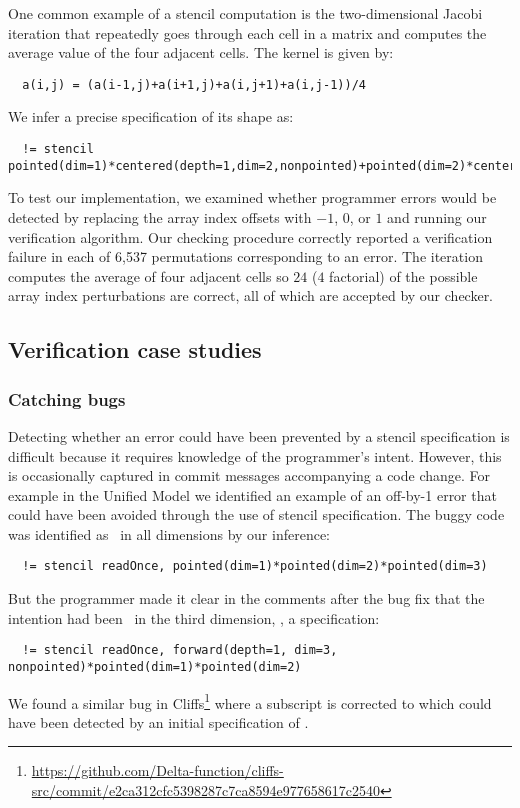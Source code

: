 \noindent
One common example of a stencil computation is the two-dimensional
Jacobi iteration that repeatedly goes through each cell in a matrix
and computes the average value of the four adjacent cells. The kernel
is given by:
\begin{verbatim}
  a(i,j) = (a(i-1,j)+a(i+1,j)+a(i,j+1)+a(i,j-1))/4
\end{verbatim}
We infer a precise specification of its shape as:
\begin{verbatim}
  != stencil pointed(dim=1)*centered(depth=1,dim=2,nonpointed)+pointed(dim=2)*centered(depth=1,dim=1,nonpointed)
\end{verbatim}
%
To test our implementation,
we examined whether programmer errors would be detected by replacing
the array index offsets with $-1$, $0$, or $1$ and running our
verification algorithm. Our checking procedure correctly reported a verification
failure in each of 6,537 permutations corresponding to an error.
The iteration computes the average of four adjacent
cells so $24$ ($4$ factorial) of the possible array index perturbations
are correct, all of which are accepted by our checker.

\subsection{Verification case studies}
\label{sec:case-studies}

\subsubsection{Catching bugs}

Detecting whether an error could have been prevented by a stencil
specification is difficult because it requires knowledge of the
programmer's intent. However, this is occasionally captured in commit
messages accompanying a code change. For example in the Unified Model
we identified an example of an off-by-1 error that could have been
avoided through the use of stencil specification. The buggy code was
identified as \pointed\ in all dimensions by our inference:

\begin{verbatim}
  != stencil readOnce, pointed(dim=1)*pointed(dim=2)*pointed(dim=3)
\end{verbatim}
%
But the programmer made it clear in the comments after the bug fix
that the intention had been \forward\ in the third dimension, \ie{}, a
specification:
%
\begin{verbatim}
  != stencil readOnce, forward(depth=1, dim=3, nonpointed)*pointed(dim=1)*pointed(dim=2)
\end{verbatim}
%
We found a similar bug in 
Cliffs\footnote{\url{https://github.com/Delta-function/cliffs-src/commit/e2ca312cfc5398287c7ca8594e977658617c2540}}
where a subscript  is corrected to  which
could have been detected by an initial specification of .


